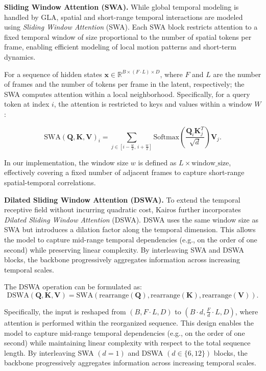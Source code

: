 \documentclass{llmxive}
\begin{document}
\textbf{Sliding Window Attention (SWA).} While global temporal modeling is handled by GLA, spatial and short-range temporal interactions are modeled using \emph{Sliding Window Attention} (SWA). Each SWA block restricts attention to a fixed temporal window of size proportional to the number of spatial tokens per frame, enabling efficient modeling of local motion patterns and short-term dynamics.


For a sequence of hidden states $\mathbf{x} \in \mathbb{R}^{B \times (F \cdot L) \times D}$, 
where $F$ and $L$ are the number of frames and the number of tokens per frame in the latent, respectively;
the SWA computes attention within a local neighborhood. Specifically, 
for a query token at index $i$, the attention is restricted to keys and values 
within a window $W$:

\begin{equation}
\mathrm{SWA}(\mathbf{Q}, \mathbf{K}, \mathbf{V})_i
=
\sum_{j \in [i - \frac{w}{2},\, i + \frac{w}{2}]}
\mathrm{Softmax}\!\left(\frac{\mathbf{Q}_i \mathbf{K}_j^{T}}{\sqrt{d}}\right)\mathbf{V}_j .
\end{equation}

In our implementation, the window size $w$ is defined as $L \times \text{window\_size}$, 
effectively covering a fixed number of adjacent frames to capture short-range 
spatial-temporal correlations.



\textbf{Dilated Sliding Window Attention (DSWA).} To extend the temporal receptive field without incurring quadratic cost, Kairos further incorporates \emph{Dilated Sliding Window Attention} (DSWA). DSWA uses the same window size as SWA but introduces a dilation factor along the temporal dimension. This allows the model to capture mid-range temporal dependencies (e.g., on the order of one second) while preserving linear complexity. By interleaving SWA and DSWA blocks, the backbone progressively aggregates information across increasing temporal scales.


The DSWA operation can be formulated as:
\begin{equation}
\mathrm{DSWA}(\mathbf{Q}, \mathbf{K}, \mathbf{V})
=
\mathrm{SWA}\!\left(
\mathrm{rearrange}(\mathbf{Q}),
\mathrm{rearrange}(\mathbf{K}),
\mathrm{rearrange}(\mathbf{V})
\right).
\end{equation}

Specifically, the input is reshaped from $(B, F\!\cdot\!L, D)$ to 
$(B\!\cdot\!d, \tfrac{F}{d}\!\cdot\!L, D)$, where attention is performed 
within the reorganized sequence. This design enables the model to capture 
mid-range temporal dependencies (e.g., on the order of one second) while 
maintaining linear complexity with respect to the total sequence length. 
By interleaving SWA $(d = 1)$ and DSWA $(d \in \{6, 12\})$ blocks, 
the backbone progressively aggregates information across increasing temporal scales.
 
\end{document}
